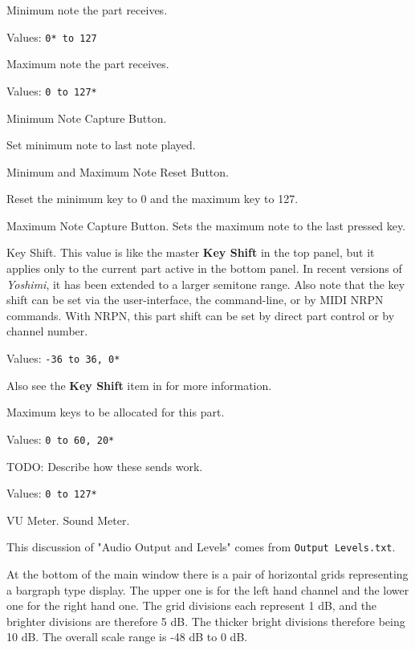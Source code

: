    Minimum note the part receives.

   Values: \texttt{0* to 127}

   Maximum note the part receives.

   Values: \texttt{0 to 127*}

   Minimum Note Capture Button.

   Set minimum note to last note played.

   Minimum and Maximum Note Reset Button.

   Reset the minimum key to 0 and the maximum key to 127.

   Maximum Note Capture Button.
   Sets the maximum note to the last pressed key.

   Key Shift.
   This value is like the master \textbf{Key Shift} in the top panel, but
   it applies only to the current part active in the bottom panel.
   In recent versions of \textsl{Yoshimi}, it has been extended to a larger
   semitone range.
   Also note that the key shift can be set via the user-interface, the
   command-line, or by MIDI NRPN commands.
   With NRPN, this part shift 
   can be set by direct part control or by channel number.

   Values: \texttt{-36 to 36, 0*}

   Also see the \textbf{Key Shift} item in 
    for more information.

   Maximum keys to be allocated for this part.

   Values: \texttt{0 to 60, 20*}


   TODO:  Describe how these sends work.

   Values: \texttt{0 to 127*}

   VU Meter.  Sound Meter.

   This discussion of "Audio Output and Levels"
   comes from \texttt{Output Levels.txt}.

   At the bottom of the main window there is a pair of horizontal grids
   representing a bargraph type display. The upper one is for the left hand
   channel and the lower one for the right hand one. The grid divisions each
   represent 1 dB, and the brighter divisions are therefore 5 dB. The thicker
   bright divisions therefore being 10 dB. The overall scale range is -48 dB to
   0 dB.

